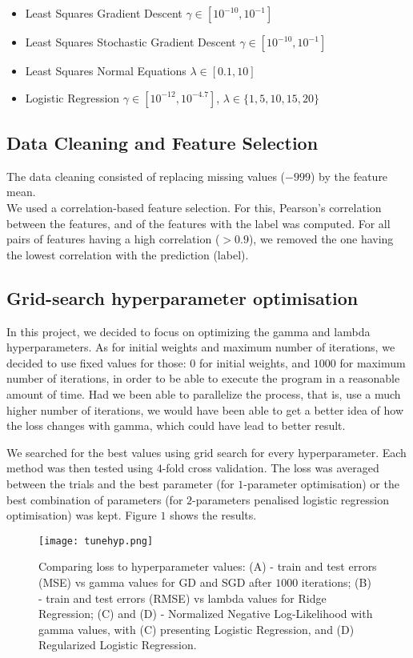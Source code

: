 \documentclass{article}
\begin{document}
		\begin{itemize}
			\item Least Squares Gradient Descent $\gamma \in [10^{-10}, 10^{-1}]$
			\item Least Squares Stochastic Gradient Descent $\gamma \in [10^{-10}, 10^{-1}]$
			\item Least Squares Normal Equations $\lambda \in [0.1, 10]$
			\item Logistic Regression $\gamma \in [10^{-12}, 10^{-4.7}]$, $\lambda \in \{1, 5, 10, 15, 20\} $
		\end{itemize}
	
	
	\subsection{Data Cleaning and Feature Selection}
	The data cleaning consisted of replacing missing values ($-999$) by the feature mean.
	\\
	We used a correlation-based feature selection. For this, Pearson’s correlation between the features, and of the features with the label was computed. For all pairs of features having a high correlation ($> 0.9$), we removed the one having the lowest correlation with the prediction (label).
	
	\subsection{Grid-search hyperparameter optimisation}
	In this project, we decided to focus on optimizing the gamma and lambda hyperparameters. As for initial weights and maximum number of iterations, we decided to use fixed values for those: $0$ for initial weights, and $1000$ for maximum number of iterations, in order to be able to execute the program in a reasonable amount of time. Had we been able to parallelize the process, that is, use a much higher number of iterations, we would have been able to get a better idea of how the loss changes with gamma, which could have lead to better result.

	We searched for the best values using grid search for every hyperparameter. Each method was then tested using $4$-fold cross validation. The loss was averaged between the trials and the best parameter (for $1$-parameter optimisation) or the best combination of parameters (for $2$-parameters penalised logistic regression optimisation) was kept. Figure $1$ shows the results.
	
	\begin{figure}\label{fig1}
		\centering
		\texttt{[image: tunehyp.png]}
		\caption{Comparing loss to hyperparameter values:
			(A) - train and test errors (MSE) vs gamma values for GD and SGD after $1000$ iterations;
			(B) - train and test errors (RMSE) vs lambda values for Ridge Regression;
			(C) and (D) - Normalized Negative Log-Likelihood with gamma values, with (C) presenting Logistic Regression, and (D) Regularized Logistic Regression.}
	\end{figure}
	
\end{document}
